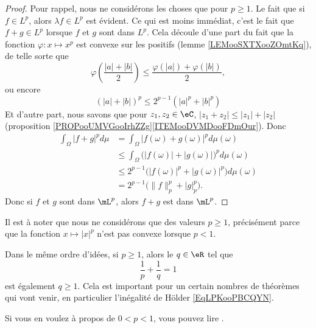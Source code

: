 \begin{proof}
    Pour rappel, nous ne considérons les choses que pour \( p\geq 1\). Le fait que si \( f\in L^p\), alors \( \lambda f\in L^p\) est évident. Ce qui est moins immédiat, c'est le fait que \( f+g\in L^p\) lorsque \( f\) et \( g\) sont dans \( L^p\). Cela découle d'une part du fait que la fonction \( \varphi\colon x\mapsto x^p\) est convexe sur les positifs (lemme \ref{LEMooSXTXooZOmtKq}), de telle sorte que
    \begin{equation}
        \varphi\left( \frac{ |a|+|b| }{2} \right)\leq\frac{ \varphi(|a|)+\varphi(|b|) }{2},
    \end{equation}
    ou encore
    \begin{equation}    \label{EqZFSduFa}
        (|a|+|b|)^p\leq 2^{p-1}(|a|^p+|b|^p)
    \end{equation}
    Et d'autre part, nous savons que pour \( z_1,z_2\in \eC\), \( | z_1+z_2 |\leq | z_1 |+| z_2 |\) (proposition \ref{PROPooUMVGooIrhZZg}\ref{ITEMooDVMDooFDmOur}). Donc
    \begin{subequations}        \label{EQooKRMEooSLHUUc}
        \begin{align}
            \int_{\Omega}| f+g |^pd\mu&=\int_{\Omega}| f(\omega)+g(\omega) |^pd\mu(\omega)\\
            &\leq \int_{\Omega}\big( | f(\omega) |+| g(\omega) | \big)^pd\mu(\omega)\\
            &\leq 2^{p-1}\big( | f(\omega) |^p+| g(\omega) |^p \big)d\mu(\omega)\\
            &=2^{p-1}\big( \| f \|_p^p+| g |_p^p \big).
        \end{align}
    \end{subequations}
    Donc si \( f\) et \( g\) sont dans \( \mL^p\), alors \( f+g\) est dans \( \mL^p\).
\end{proof}

\begin{normaltext}
    Il est à noter que nous ne considérons que des valeurs \( p\geq 1\), précisément parce que la fonction \( x\mapsto | x |^p\) n'est pas convexe lorsque \( p<1\).

    Dans le même ordre d'idées, si \( p\geq 1\), alors le \( q\in \eR\) tel que
    \begin{equation}
        \frac{1}{ p }+\frac{1}{ q }=1
    \end{equation}
    est également \( q\geq 1\). Cela est important pour un certain nombres de théorèmes qui vont venir, en particulier l'inégalité de Hölder \eqref{EqLPKooPBCQYN}.

    Si vous en voulez à propos de \( 0<p<1\), vous pouvez lire \cite{ooECQXooZUqbSO}.
\end{normaltext}

